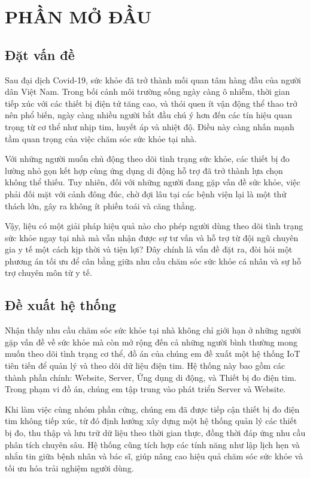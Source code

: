 
\section*{PHẦN MỞ ĐẦU}
\subsection*{Đặt vấn đề} 

Sau đại dịch Covid-19, sức khỏe đã trở thành mối quan tâm hàng đầu của người dân Việt Nam. Trong bối cảnh môi trường sống ngày càng ô nhiễm, thời gian tiếp xúc với các thiết bị điện tử tăng cao, và thói quen ít vận động thể thao trở nên phổ biến, ngày càng nhiều người bắt đầu chú ý hơn đến các tín hiệu quan trọng từ cơ thể như nhịp tim, huyết áp và nhiệt độ. Điều này càng nhấn mạnh tầm quan trọng của việc chăm sóc sức khỏe tại nhà.

Với những người muốn chủ động theo dõi tình trạng sức khỏe, các thiết bị đo lường nhỏ gọn kết hợp cùng ứng dụng di động hỗ trợ đã trở thành lựa chọn không thể thiếu. Tuy nhiên, đối với những người đang gặp vấn đề sức khỏe, việc phải đối mặt với cảnh đông đúc, chờ đợi lâu tại các bệnh viện lại là một thử thách lớn, gây ra không ít phiền toái và căng thẳng.

Vậy, liệu có một giải pháp hiệu quả nào cho phép người dùng theo dõi tình trạng sức khỏe ngay tại nhà mà vẫn nhận được sự tư vấn và hỗ trợ từ đội ngũ chuyên gia y tế một cách kịp thời và tiện lợi? Đây chính là vấn đề đặt ra, đòi hỏi một phương án tối ưu để cân bằng giữa nhu cầu chăm sóc sức khỏe cá nhân và sự hỗ trợ chuyên môn từ y tế.

\subsection*{Đề xuất hệ thống}


Nhận thấy nhu cầu chăm sóc sức khỏe tại nhà không chỉ giới hạn ở những người gặp vấn đề về sức khỏe mà còn mở rộng đến cả những người bình thường mong muốn theo dõi tình trạng cơ thể, đồ án của chúng em đề xuất một hệ thống IoT tiên tiến để quản lý và theo dõi dữ liệu điện tim. Hệ thống này bao gồm các thành phần chính: Website, Server, Ứng dụng di động, và Thiết bị đo điện tim.
Trong phạm vi đồ án, chúng em tập trung vào phát triển Server và Website.

Khi làm việc cùng nhóm phần cứng, chúng em đã được tiếp cận thiết bị đo điện tim không tiếp xúc, từ đó định hướng xây dựng một hệ thống quản lý các thiết bị đo, thu thập và lưu trữ dữ liệu theo thời gian thực, đồng thời đáp ứng nhu cầu phân tích chuyên sâu. Hệ thống cũng tích hợp các tính năng như lập lịch hẹn và nhắn tin giữa bệnh nhân và bác sĩ, giúp nâng cao hiệu quả chăm sóc sức khỏe và tối ưu hóa trải nghiệm người dùng.

